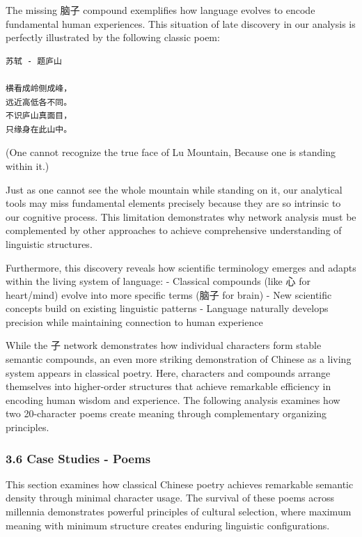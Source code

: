 \documentclass[
  11pt,
  letterpaper,
]{article}
\begin{document}
The missing 脑子 compound exemplifies how language evolves to encode
fundamental human experiences. This situation of late discovery in our
analysis is perfectly illustrated by the following classic poem:

\begin{verbatim}
苏轼 - 题庐山

横看成岭侧成峰，
远近高低各不同。
不识庐山真面目，
只缘身在此山中。
\end{verbatim}

(One cannot recognize the true face of Lu Mountain, Because one is
standing within it.)

Just as one cannot see the whole mountain while standing on it, our
analytical tools may miss fundamental elements precisely because they
are so intrinsic to our cognitive process. This limitation demonstrates
why network analysis must be complemented by other approaches to achieve
comprehensive understanding of linguistic structures.

Furthermore, this discovery reveals how scientific terminology emerges
and adapts within the living system of language: - Classical compounds
(like 心 for heart/mind) evolve into more specific terms (脑子 for
brain) - New scientific concepts build on existing linguistic patterns -
Language naturally develops precision while maintaining connection to
human experience

While the 子 network demonstrates how individual characters form stable
semantic compounds, an even more striking demonstration of Chinese as a
living system appears in classical poetry. Here, characters and
compounds arrange themselves into higher-order structures that achieve
remarkable efficiency in encoding human wisdom and experience. The
following analysis examines how two 20-character poems create meaning
through complementary organizing principles.

\hypertarget{case-studies---poems}{%
\subsubsection{3.6 Case Studies - Poems}\label{case-studies---poems}}

This section examines how classical Chinese poetry achieves remarkable
semantic density through minimal character usage. The survival of these
poems across millennia demonstrates powerful principles of cultural
selection, where maximum meaning with minimum structure creates enduring
linguistic configurations.
\end{document}
